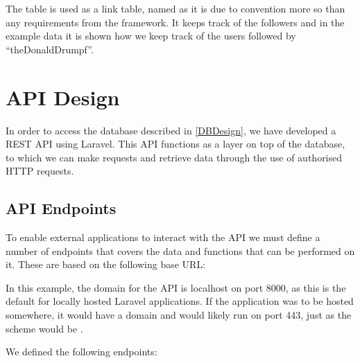 The table  is used as a link table, named as it is due
to convention more so than any requirements from the framework. It keeps track
of the followers and in the example data it is shown how we keep track of the
users followed by ``theDonaldDrumpf''.

\section{\acs{API} Design}
In order to access the database described in \autoref{DBDesign}, we have
developed a \ac{REST} \ac{API} using Laravel. This
\ac{API} functions as a layer on top of the database, to which we can make
requests and retrieve data through the use of authorised \ac{HTTP} requests.

\subsection{\acs{API} Endpoints}
To enable external applications to interact with the \ac{API} we must
define a number of endpoints that covers the data and functions that can be
performed on it. These are based on the following base \ac{URL}:\nl

\nl

In this example, the domain for the \ac{API} is localhost on port 8000, as this is
the default for locally hosted Laravel applications. If the application was to
be hosted somewhere, it would have a domain and would likely run on port 443,
just as the scheme would be .

We defined the following endpoints:

